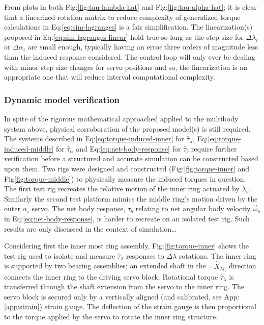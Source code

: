 \par
From plots in both Fig:\ref{fig:tau-lambda-hat} and Fig:\ref{fig:tau-alpha-hat}; it is clear that a linearized rotation matrix to reduce complexity of generalized torque calculations in Eq:\ref{eq:sim-lagranges} is a fair simplification. The linearization(s) proposed in Eq:\ref{eq:sim-lagranges-linear} hold true so long as the step size for $\Delta\lambda_i$ or $\Delta\alpha_i$ are small enough, typically having an error three orders of magnitude less than the induced response considered. The control loop will only ever be dealing with minor step size changes for servo positions and so, the linearization is an appropriate one that will reduce interval computational complexity.
\subsubsection{Dynamic model verification}
In spite of the rigorous mathematical approached applied to the multibody system above, physical corroboration of the proposed model(s) is still required. The systems described in Eq:\ref{eq:torque-induced-inner} for $\hat{\tau}_\lambda$, Eq:\ref{eq:torque-induced-middle} for $\hat{\tau}_\alpha$ and Eq:\ref{eq:net-body-response} for $\hat{\tau}_b$ require further verification before a structured and accurate simulation can be constructed based upon them. Two rigs were designed and constructed (Fig:\ref{fig:torque-inner} and Fig\ref{fig:torque-middle}) to physically measure the induced torques in question. The first test rig recreates the relative motion of the inner ring actuated by $\lambda_i$. Similarly the second test platform mimics the middle ring's motion driven by the outer $\alpha_i$ servo. The net body response, $\hat{\tau}_b$ relating to net angular body velocity $\vec{\omega}_b$ in Eq:\ref{eq:net-body-response}, is harder to recreate on an isolated test rig. Such results are only discussed in the context of simulation\ldots
\par
Considering first the inner most ring assembly, Fig:\ref{fig:torque-inner} shows the test rig used to isolate and measure $\hat{\tau}_\lambda$ responses to $\Delta\lambda$ rotations. The inner ring is supported by two bearing assemblies; an extended shaft in the $-\hat{X}_{M_i}$ direction connects the inner ring to the driving servo block. Rotational torque $\hat{\tau}_\lambda$ is transferred through the shaft extension from the servo to the inner ring. The servo block is secured only by a vertically aligned (and calibrated, see App:\ref{app:strain}) strain gauge. The deflection of the strain gauge is then proportional to the torque applied by the servo to rotate the inner ring structure.
